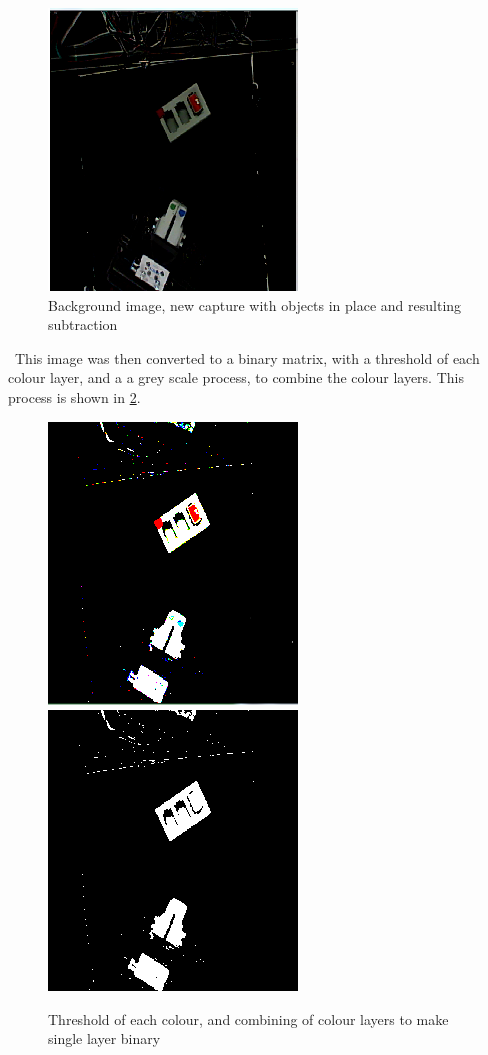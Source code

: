 \documentclass[11pt,a4paper]{report}
\begin{document}
\begin{figure}
			\includegraphics[width=0.6\linewidth]{diff}
	\caption{ Background image, new capture with objects in place and resulting subtraction }
	\label{fig:backgrond}
\end{figure} \
This image was then converted to a binary matrix, with a threshold of each colour layer, and a a grey scale process, to combine the colour layers. This process is shown in \cref{fig:out2}.\\ 
\begin{figure}
	\hspace*{-0.1\linewidth}
\includegraphics[width=0.6\linewidth]{out1} %
\includegraphics[width=0.6\linewidth]{out2}
\caption{Threshold of each colour, and combining of colour layers to make single layer binary}
\label{fig:out2}
\end{figure}
\end{document}
